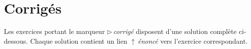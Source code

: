 \chapter*{Corrig\'es}

Les exercices portant le marqueur
\textcolor{OR!75}{\small$\triangleright$\,\textit{corrig\'e}}
disposent d'une solution compl\`ete ci-dessous.
Chaque solution contient un lien \textcolor{OR!75}{$\uparrow$\,\textit{\'enonc\'e}}
vers l'exercice correspondant.


